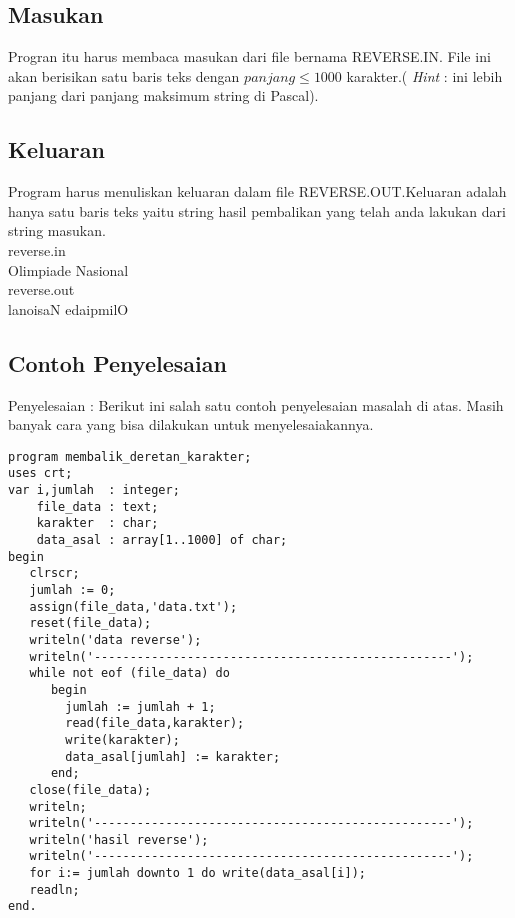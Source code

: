 \documentclass[a4paper,10pt,makeidx]{article}
\begin{document}
\subsection{Masukan}
\par
\indent
\indent
Progran itu harus membaca masukan dari file bernama REVERSE.IN. File ini akan
berisikan satu baris teks dengan $panjang\le 1000$ karakter.( {\itshape Hint}
: ini lebih panjang dari panjang maksimum string di Pascal).
\subsection{Keluaran}
\par
\indent
\indent
Program harus menuliskan keluaran dalam file REVERSE.OUT.Keluaran adalah hanya
satu baris teks yaitu string hasil pembalikan yang telah anda lakukan dari string
masukan. \\
reverse.in         \\
Olimpiade Nasional \\

reverse.out        \\
lanoisaN edaipmilO \\
\subsection{Contoh Penyelesaian}
Penyelesaian : Berikut ini salah satu contoh penyelesaian masalah di atas.
Masih banyak cara yang bisa dilakukan untuk menyelesaiakannya.
\begin{verbatim}
program membalik_deretan_karakter;
uses crt;
var i,jumlah  : integer;
    file_data : text;
    karakter  : char;
    data_asal : array[1..1000] of char;
begin
   clrscr;
   jumlah := 0;
   assign(file_data,'data.txt');
   reset(file_data);
   writeln('data reverse');
   writeln('--------------------------------------------------');
   while not eof (file_data) do
      begin
        jumlah := jumlah + 1;
        read(file_data,karakter);
        write(karakter);
        data_asal[jumlah] := karakter;
      end;
   close(file_data);
   writeln;
   writeln('--------------------------------------------------');
   writeln('hasil reverse');
   writeln('--------------------------------------------------');
   for i:= jumlah downto 1 do write(data_asal[i]);
   readln;
end.
\end{verbatim}
\end{document}
